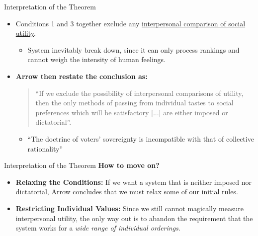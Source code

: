 \documentclass{beamer}
\begin{document}
\begin{frame}{Interpretation of the Theorem}

    \begin{itemize}
        \item Conditions 1 and 3 together exclude any \uline{interpersonal comparison of social utility}.
        \begin{itemize}
            \item[$\Rightarrow$] System inevitably break down, since it can only process rankings and cannot weigh the intensity of human feelings.
        \end{itemize}
        \vspace{0.5 cm}
        \item \textbf{Arrow then restate the conclusion as:}
        \begin{quote}
            ``If we exclude the possibility of interpersonal comparisons of utility, then the only methods of passing from individual tastes to social preferences which will be satisfactory [...] are either imposed or dictatorial''.
        \end{quote}
        \begin{itemize}
            \item[$\Rightarrow$] ``The doctrine of voters' sovereignty is incompatible with that of collective rationality''
        \end{itemize}
    \end{itemize}
\end{frame}

\begin{frame}{Interpretation of the Theorem}
    \textbf{How to move on?}
    \vspace{0.25 cm}
    \begin{itemize}
        \item \textbf{Relaxing the Conditions:} If we want a system that is neither imposed nor dictatorial, Arrow concludes that we must relax some of our initial rules.
        \vspace{0.5 cm}
        \item \textbf{Restricting Individual Values:} Since we still cannot magically measure interpersonal utility, the only way out is to abandon the requirement that the system works for a \textit{wide range of individual orderings}.
    \end{itemize}
\end{frame}
\end{document}
